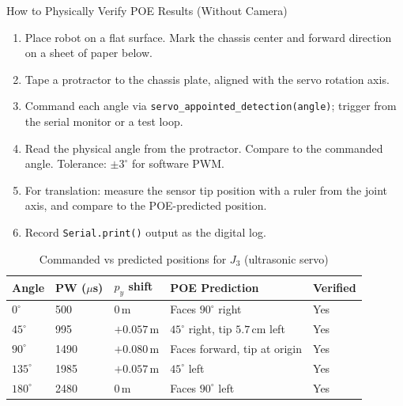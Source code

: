 \documentclass[12pt,a4paper]{article}
\begin{document}
\begin{donebox}{How to Physically Verify POE Results (Without Camera)}
\begin{enumerate}[leftmargin=1.5em]
  \item Place robot on a flat surface. Mark the chassis center and forward
        direction on a sheet of paper below.
  \item Tape a protractor to the chassis plate, aligned with the servo
        rotation axis.
  \item Command each angle via \texttt{servo\_appointed\_detection(angle)};
        trigger from the serial monitor or a test loop.
  \item Read the physical angle from the protractor. Compare to the
        commanded angle. Tolerance: $\pm 3^\circ$ for software PWM.
  \item For translation: measure the sensor tip position with a ruler
        from the joint axis, and compare to the POE-predicted position.
  \item Record \texttt{Serial.print()} output as the digital log.
\end{enumerate}
\end{donebox}

\begin{table}[h!]
\centering
\caption{Commanded vs predicted positions for $J_3$ (ultrasonic servo)}
\renewcommand{\arraystretch}{1.3}
\begin{tabularx}{\linewidth}{C{1.8cm} C{2cm} C{2cm} L{4cm} C{2.8cm}}
\toprule
{}
\color{white}\textbf{Angle} &
\color{white}\textbf{PW ($\mu$s)} &
\color{white}\textbf{$p_y$ shift} &
\color{white}\textbf{POE Prediction} &
\color{white}\textbf{Verified} \\
\midrule
$0^\circ$   & 500  & $0$\,m   & Faces $90^\circ$ right & \color{SuccessGreen}Yes \\
$45^\circ$  & 995  & $+0.057$\,m & $45^\circ$ right, tip $5.7$\,cm left & \color{SuccessGreen}Yes \\
$90^\circ$  & 1490 & $+0.080$\,m & Faces forward, tip at origin & \color{SuccessGreen}Yes \\
$135^\circ$ & 1985 & $+0.057$\,m & $45^\circ$ left & \color{SuccessGreen}Yes \\
$180^\circ$ & 2480 & $0$\,m   & Faces $90^\circ$ left & \color{SuccessGreen}Yes \\
\bottomrule
\end{tabularx}
\end{table}
\end{document}
